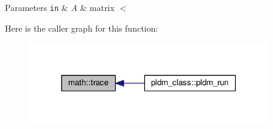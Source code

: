 \begin{DoxyParams}[1]{Parameters}
\mbox{\tt in}  & {\em A} & matrix $<$ \\
\hline
\end{DoxyParams}


Here is the caller graph for this function\+:\nopagebreak
\begin{figure}[H]
\begin{center}
\leavevmode
\includegraphics[width=294pt]{classmath_a9f8f22c01066f03fe5900edb63b56c89_icgraph}
\end{center}
\end{figure}




